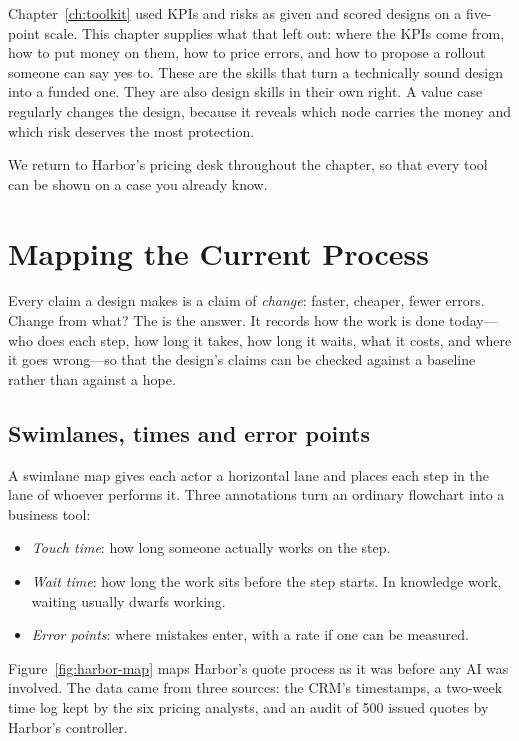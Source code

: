 Chapter~\ref{ch:toolkit} used KPIs and risks as given and scored designs on a five-point scale. This chapter supplies what that left out: where the KPIs come from, how to put money on them, how to price errors, and how to propose a rollout someone can say yes to. These are the skills that turn a technically sound design into a funded one. They are also design skills in their own right. A value case regularly changes the design, because it reveals which node carries the money and which risk deserves the most protection.

We return to Harbor's pricing desk throughout the chapter, so that every tool can be shown on a case you already know.

\section{Mapping the Current Process}
\label{sec:process-map}

Every claim a design makes is a claim of \emph{change}: faster, cheaper, fewer errors. Change from what? The  is the answer. It records how the work is done today---who does each step, how long it takes, how long it waits, what it costs, and where it goes wrong---so that the design's claims can be checked against a baseline rather than against a hope.

\subsection{Swimlanes, times and error points}

A swimlane map gives each actor a horizontal lane and places each step in the lane of whoever performs it. Three annotations turn an ordinary flowchart into a business tool:
\begin{itemize}[itemsep=1pt]
  \item \emph{Touch time}: how long someone actually works on the step.
  \item \emph{Wait time}: how long the work sits before the step starts. In knowledge work, waiting usually dwarfs working.
  \item \emph{Error points}: where mistakes enter, with a rate if one can be measured.
\end{itemize}

Figure~\ref{fig:harbor-map} maps Harbor's quote process as it was before any AI was involved. The data came from three sources: the CRM's timestamps, a two-week time log kept by the six pricing analysts, and an audit of 500 issued quotes by Harbor's controller.

